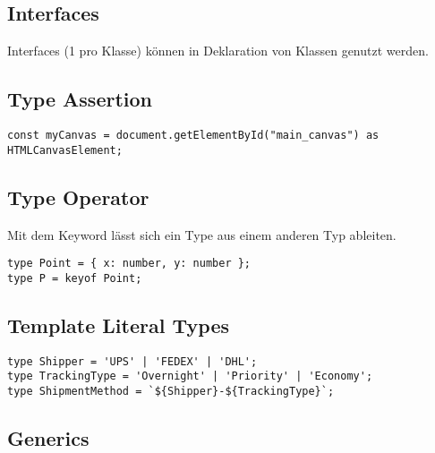 \subsection{Interfaces}
Interfaces (1 pro Klasse) können in Deklaration von Klassen genutzt werden.

\subsection{Type Assertion}
\begin{lstlisting}[style=htmlcssjs]
const myCanvas = document.getElementById("main_canvas") as HTMLCanvasElement; 
\end{lstlisting}

\subsection{Type Operator}
Mit dem Keyword lässt sich ein Type aus einem anderen Typ ableiten.
\begin{lstlisting}[style=JS]
type Point = { x: number, y: number };
type P = keyof Point;
\end{lstlisting}

\subsection{Template Literal Types}
\begin{lstlisting}[style=JS]
type Shipper = 'UPS' | 'FEDEX' | 'DHL';
type TrackingType = 'Overnight' | 'Priority' | 'Economy'; 
type ShipmentMethod = `${Shipper}-${TrackingType}`;
\end{lstlisting}

\subsection{Generics}





